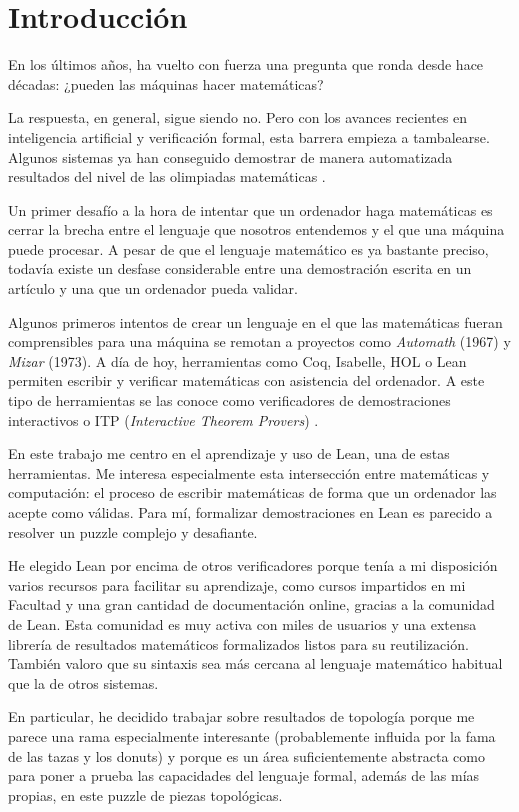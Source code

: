 \section{Introducción}

En los últimos años, ha vuelto con fuerza una pregunta que ronda desde hace décadas: ¿pueden las máquinas hacer matemáticas?

La respuesta, en general, sigue siendo no. Pero con los avances recientes en inteligencia artificial y verificación formal, esta barrera empieza a tambalearse. Algunos sistemas ya han conseguido demostrar de manera automatizada resultados del nivel de las olimpiadas matemáticas \cite{trinh2024solving}.

Un primer desafío a la hora de intentar que un ordenador haga matemáticas es cerrar la brecha entre el lenguaje que nosotros entendemos y el que una máquina puede procesar. A pesar de que el lenguaje matemático es ya bastante preciso, todavía existe un desfase considerable entre una demostración escrita en un artículo y una que un ordenador pueda validar.

Algunos primeros intentos de crear un lenguaje en el que las matemáticas fueran comprensibles para una máquina se remotan a proyectos como \textit{Automath} (1967) y \textit{Mizar} (1973). A día de hoy, herramientas como Coq, Isabelle, HOL o Lean permiten escribir y verificar matemáticas con asistencia del ordenador. A este tipo de herramientas se las conoce como verificadores de demostraciones interactivos o ITP (\textit{Interactive Theorem Provers}) \cite{geuvers2009proof}.

En este trabajo me centro en el aprendizaje y uso de Lean, una de estas herramientas. Me interesa especialmente esta intersección entre matemáticas y computación: el proceso de escribir matemáticas de forma que un ordenador las acepte como válidas. Para mí, formalizar demostraciones en Lean es parecido a resolver un puzzle complejo y desafiante.

He elegido Lean por encima de otros verificadores porque tenía a mi disposición varios recursos para facilitar su aprendizaje, como cursos impartidos en mi Facultad y una gran cantidad de documentación online, gracias a la comunidad de Lean. Esta comunidad es muy activa con miles de usuarios y una extensa librería de resultados matemáticos formalizados listos para su reutilización. También valoro que su sintaxis sea más cercana al lenguaje matemático habitual que la de otros sistemas.

En particular, he decidido trabajar sobre resultados de topología porque me parece una rama especialmente interesante (probablemente influida por la fama de las tazas y los donuts) y porque es un área suficientemente abstracta como para poner a prueba las capacidades del lenguaje formal, además de las mías propias, en este puzzle de piezas topológicas.


